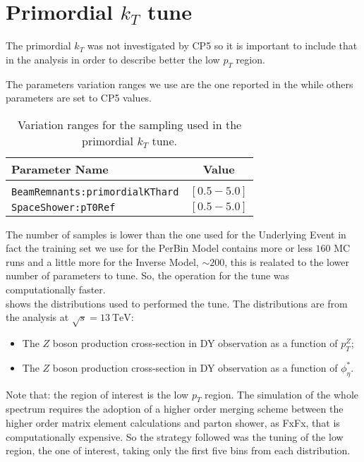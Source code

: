 \section{Primordial $k_T$ tune}

The primordial $k_T$ was not investigated by CP5 so it is important to include that in the analysis in order to describe better the low $p_T$ region. 

The parameters variation ranges we use are the one reported in the  while others parameters are set to CP5 values.



\begin{table}[!htb]
\centering
\begin{tabular}{l | c }
Parameter Name & Value \\ 
\hline \hline
\\[-0.85em]
	\texttt{BeamRemnants:primordialKThard} & $[0.5 - 5.0]$\\[2pt]
	\texttt{SpaceShower:pT0Ref} & $[0.5 - 5.0]$\\
\end{tabular}
\caption{Variation ranges for the sampling used in the primordial $k_T$ tune.}
\label{table:primordialkT_variations}
\end{table} 

The number of samples is lower than the one used for the Underlying Event in fact the training set we use for the PerBin Model contains more or less $160$ MC runs and a little more for the Inverse Model, $\sim 200$, this is realated to the lower number of parameters to tune. So, the operation for the tune was computationally faster.
\\
 shows the distributions used to performed the tune. The distributions  are from the \cite{ZpT_distributions} analysis at $\sqrt{s}=13\ \mathrm{TeV}$:
\begin{itemize}
	\item The $Z$ boson production cross-section in DY observation as a function of $p_T^Z$;
	\item The $Z$ boson production cross-section in DY observation as a function of $\phi_\eta^*$.
\end{itemize}

\noindent Note that: the region of interest is the low $p_T$ region. The simulation of the whole spectrum requires the adoption of a higher order merging scheme between the higher order matrix element calculations and parton shower, as FxFx, that is computationally expensive. So the strategy followed was the tuning of the low region, the one of interest, taking only the first five bins from each distribution.  


